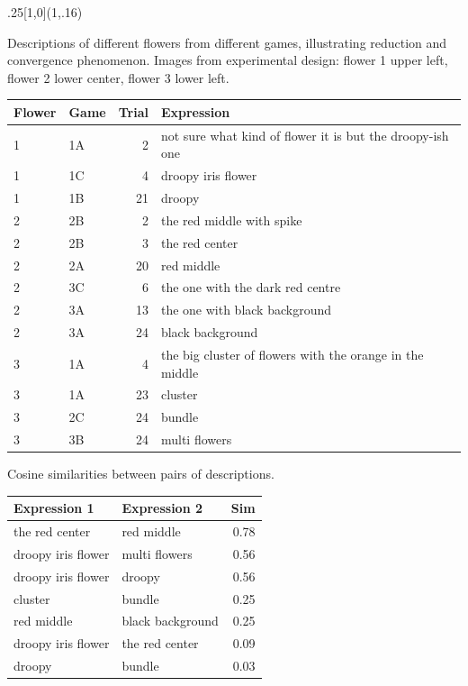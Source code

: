 \documentclass[10pt, xcolor=table, dvipsnames]{beamer}
\begin{document}
		\begin{textblock}{.25}[1,0](1,.16)
	\begin{tcolorbox}[title={\centering Examples}]
		
		\centering
		\begin{footnotesize}
			Descriptions of different flowers from different games, illustrating reduction and convergence phenomenon. Images from experimental design: flower 1 upper left, flower 2 lower center, flower 3 lower left.
			\vspace{-1em}
			
			\centering
			\begin{tabular}[t]{llr>{\raggedright\arraybackslash}p{16em}}
				\toprule
				Flower & Game & Trial & Expression\\
				\midrule
				1 & 1A & 2 & not sure what kind of flower it is but the droopy-ish one\\
				1 & 1C & 4 & droopy iris flower\\
				1 & 1B & 21 & droopy\\
				\midrule
				2 & 2B & 2 & the red middle with spike\\
				2 & 2B & 3 & the red center\\
				2 & 2A & 20 & red middle\\
				2 & 3C & 6 & the one with the dark red centre\\
				2 & 3A & 13 & the one with black background\\
				2 & 3A & 24 & black background\\
				\midrule
				3 & 1A & 4 & the big cluster of flowers with the orange in the middle\\
				3 & 1A & 23 & cluster\\
				3 & 2C & 24 & bundle\\
				3 & 3B & 24 & multi flowers\\
				\bottomrule
			\end{tabular}
			
			\vspace{2em}
			Cosine similarities between pairs of descriptions. 
			
			\vspace{-1em}
			\begin{tabular}[t]{>{\raggedright\arraybackslash}p{9em}>{\raggedright\arraybackslash}p{9em}r}
				\toprule
				Expression 1 & Expression 2 & Sim\\
				\midrule
				the red center & red middle & 0.78\\
				droopy iris flower & multi flowers & 0.56\\
				droopy iris flower & droopy & 0.56\\
				cluster & bundle & 0.25\\
				red middle & black background & 0.25\\
				droopy iris flower & the red center & 0.09\\
				droopy & bundle & 0.03\\
				\bottomrule
			\end{tabular}
		\end{footnotesize}
		
	\end{tcolorbox}
\end{textblock}
\end{document}
